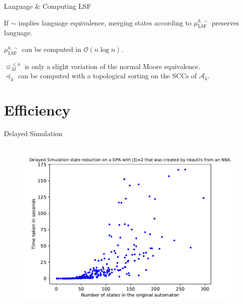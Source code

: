 \begin{frame}{Language \& Computing LSF}
\begin{theorem}
	If $\sim$ implies language equivalence, merging states according to $\mu_\text{LSF}^{k,\sim}$ preserves language.
\end{theorem}

\pause
\vspace{1cm}

	\begin{theorem}
		$\mu_\text{LSF}^{k,\sim}$ can be computed in $\mathcal{O}(n \log n)$.
	\end{theorem}
	
$\equiv_M^{\leq k}$ is only a slight variation of the normal Moore equivalence. \\
$\preceq_k$ can be computed with a topological sorting on the SCCs of $\mathcal{A}_k$.
\end{frame}







\section{Efficiency}

\begin{frame}{Delayed Simulation}
\begin{figure}
	\centering
	\includegraphics[page=6,height=.8\textheight]{../data/analysis/fritzwilke/detnbaut_ap1.pdf} 
\end{figure}
\end{frame}


